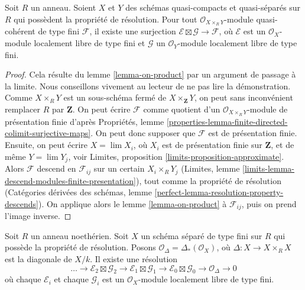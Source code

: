 \begin{lemma}
\label{lemma-on-product-general}
Soit $R$ un anneau. Soient $X$ et $Y$ des schémas quasi-compacts et quasi-séparés
sur $R$ qui possèdent la propriété de résolution. Pour tout
$\mathcal{O}_{X \times_R Y}$-module quasi-cohérent de type fini $\mathcal{F}$,
il existe une surjection $\mathcal{E} \boxtimes \mathcal{G} \to \mathcal{F}$,
où $\mathcal{E}$ est un $\mathcal{O}_X$-module localement libre de type fini
et $\mathcal{G}$ un $\mathcal{O}_Y$-module localement libre de type fini.
\end{lemma}

\begin{proof}
Cela résulte du lemme \ref{lemma-on-product} par un argument de passage à la limite.
Nous conseillons vivement au lecteur de ne pas lire la démonstration.
Comme $X \times_R Y$ est un sous-schéma fermé de $X \times_\mathbf{Z} Y$,
on peut sans inconvénient remplacer $R$ par $\mathbf{Z}$.
On peut écrire $\mathcal{F}$ comme quotient d'un
$\mathcal{O}_{X \times_R Y}$-module de présentation finie d'après
Propriétés, lemme
\ref{properties-lemma-finite-directed-colimit-surjective-maps}.
On peut donc supposer que $\mathcal{F}$ est de
présentation finie. Ensuite, on peut écrire $X = \lim X_i$,
où $X_i$ est de présentation finie sur $\mathbf{Z}$, et de même
$Y = \lim Y_j$, voir Limites, proposition \ref{limits-proposition-approximate}.
Alors $\mathcal{F}$ descend en $\mathcal{F}_{ij}$ sur un certain $X_i \times_R Y_j$
(Limites, lemme \ref{limits-lemma-descend-modules-finite-presentation}), tout comme
la propriété de résolution
(Catégories dérivées des schémas, lemme
\ref{perfect-lemma-resolution-property-descends}).
On applique alors le lemme \ref{lemma-on-product}
à $\mathcal{F}_{ij}$, puis on prend l'image inverse.
\end{proof}

\begin{lemma}
\label{lemma-diagonal-resolution}
Soit $R$ un anneau noethérien. Soit $X$ un schéma séparé de type fini
sur $R$ qui possède la propriété de résolution. Posons
$\mathcal{O}_\Delta = \Delta_*(\mathcal{O}_X)$, où
$\Delta : X \to X \times_R X$ est la diagonale de $X/k$.
Il existe une résolution
$$
\ldots \to
\mathcal{E}_2 \boxtimes \mathcal{G}_2 \to
\mathcal{E}_1 \boxtimes \mathcal{G}_1 \to
\mathcal{E}_0 \boxtimes \mathcal{G}_0 \to
\mathcal{O}_\Delta \to 0
$$
où chaque $\mathcal{E}_i$ et chaque $\mathcal{G}_i$ est un
$\mathcal{O}_X$-module localement libre de type fini.
\end{lemma}


